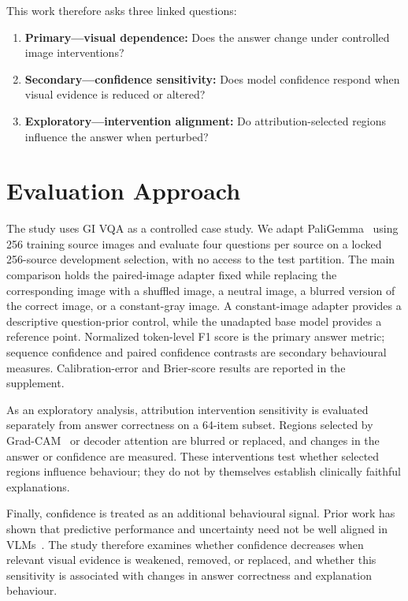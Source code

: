 \documentclass[letterpaper]{article}
\begin{document}
This work therefore asks three linked questions:
\begin{enumerate}
    \item \textbf{Primary---visual dependence:} Does the answer change under controlled image interventions?
    \item \textbf{Secondary---confidence sensitivity:} Does model confidence respond when visual evidence is reduced or altered?
    \item \textbf{Exploratory---intervention alignment:} Do attribution-selected regions influence the answer when perturbed?
\end{enumerate}

\section{Evaluation Approach}

The study uses GI VQA as a controlled case study. We adapt PaliGemma~\cite{beyer2024paligemma} using 256 training source images and evaluate four questions per source on a locked 256-source development selection, with no access to the test partition. The main comparison holds the paired-image adapter fixed while replacing the corresponding image with a shuffled image, a neutral image, a blurred version of the correct image, or a constant-gray image. A constant-image adapter provides a descriptive question-prior control, while the unadapted base model provides a reference point. Normalized token-level F1 score is the primary answer metric; sequence confidence and paired confidence contrasts are secondary behavioural measures. Calibration-error and Brier-score results are reported in the supplement.

As an exploratory analysis, attribution intervention sensitivity is evaluated separately from answer correctness on a 64-item subset. Regions selected by Grad-CAM~\cite{selvaraju2017gradcam} or decoder attention are blurred or replaced, and changes in the answer or confidence are measured. These interventions test whether selected regions influence behaviour; they do not by themselves establish clinically faithful explanations.

Finally, confidence is treated as an additional behavioural signal. Prior work has shown that predictive performance and uncertainty need not be well aligned in VLMs~\cite{kostumov2024uncertainty}. The study therefore examines whether confidence decreases when relevant visual evidence is weakened, removed, or replaced, and whether this sensitivity is associated with changes in answer correctness and explanation behaviour.
\end{document}
